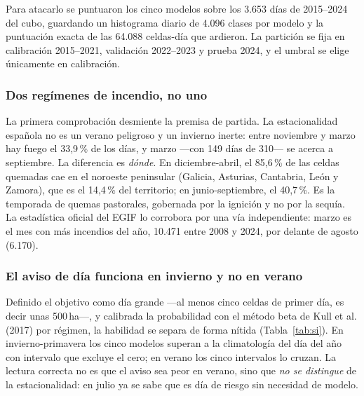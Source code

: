 \documentclass[10pt,a4paper]{article}
\begin{document}
Para atacarlo se puntuaron los cinco modelos sobre los 3.653 días de 2015--2024
del cubo, guardando un histograma diario de 4.096 clases por modelo y la
puntuación exacta de las 64.088 celdas-día que ardieron. La partición se fija en
calibración 2015--2021, validación 2022--2023 y prueba 2024, y el umbral se
elige únicamente en calibración.

\subsubsection*{Dos regímenes de incendio, no uno}

La primera comprobación desmiente la premisa de partida. La estacionalidad
española no es un verano peligroso y un invierno inerte: entre noviembre y marzo
hay fuego el 33,9\,\% de los días, y marzo ---con 149 días de 310--- se acerca a
septiembre. La diferencia es \emph{dónde}. En diciembre-abril, el 85,6\,\% de las
celdas quemadas cae en el noroeste peninsular (Galicia, Asturias, Cantabria,
León y Zamora), que es el 14,4\,\% del territorio; en junio-septiembre, el
40,7\,\%. Es la temporada de quemas pastorales, gobernada por la ignición y no
por la sequía. La estadística oficial del EGIF lo corrobora por una vía
independiente: marzo es el mes con más incendios del año, 10.471 entre 2008 y
2024, por delante de agosto (6.170).

\subsubsection*{El aviso de día funciona en invierno y no en verano}

Definido el objetivo como día grande ---al menos cinco celdas de primer día, es
decir unas 500\,ha---, y calibrada la probabilidad con el método beta de
Kull et al. (2017) por régimen, la habilidad se separa de forma nítida
(Tabla~\ref{tab:si}). En invierno-primavera los cinco modelos superan a la
climatología del día del año con intervalo que excluye el cero; en verano los
cinco intervalos lo cruzan. La lectura correcta no es que el aviso sea peor en
verano, sino que \emph{no se distingue} de la estacionalidad: en julio ya se sabe
que es día de riesgo sin necesidad de modelo.
\end{document}
